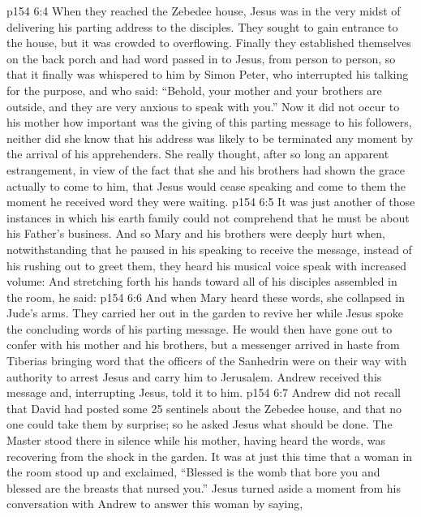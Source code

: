 \vs p154 6:4 When they reached the Zebedee house, Jesus was in the very midst of delivering his parting address to the disciples. They sought to gain entrance to the house, but it was crowded to overflowing. Finally they established themselves on the back porch and had word passed in to Jesus, from person to person, so that it finally was whispered to him by Simon Peter, who interrupted his talking for the purpose, and who said: “Behold, your mother and your brothers are outside, and they are very anxious to speak with you.” Now it did not occur to his mother how important was the giving of this parting message to his followers, neither did she know that his address was likely to be terminated any moment by the arrival of his apprehenders. She really thought, after so long an apparent estrangement, in view of the fact that she and his brothers had shown the grace actually to come to him, that Jesus would cease speaking and come to them the moment he received word they were waiting.
\vs p154 6:5 It was just another of those instances in which his earth family could not comprehend that he must be about his Father’s business. And so Mary and his brothers were deeply hurt when, notwithstanding that he paused in his speaking to receive the message, instead of his rushing out to greet them, they heard his musical voice speak with increased volume:  And stretching forth his hands toward all of his disciples assembled in the room, he said: 
\vs p154 6:6 And when Mary heard these words, she collapsed in Jude’s arms. They carried her out in the garden to revive her while Jesus spoke the concluding words of his parting message. He would then have gone out to confer with his mother and his brothers, but a messenger arrived in haste from Tiberias bringing word that the officers of the Sanhedrin were on their way with authority to arrest Jesus and carry him to Jerusalem. Andrew received this message and, interrupting Jesus, told it to him.
\vs p154 6:7 Andrew did not recall that David had posted some 25 sentinels about the Zebedee house, and that no one could take them by surprise; so he asked Jesus what should be done. The Master stood there in silence while his mother, having heard the words,  was recovering from the shock in the garden. It was at just this time that a woman in the room stood up and exclaimed, “Blessed is the womb that bore you and blessed are the breasts that nursed you.” Jesus turned aside a moment from his conversation with Andrew to answer this woman by saying, 

